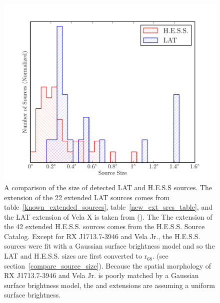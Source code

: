 \documentclass[12pt,preprint]{aastex}
\newcommand{\gev}{\text{GeV}\xspace}
\newcommand{\tev}{\text{TeV}\xspace}
\newcommand{\rsixeight}{{\ensuremath{\text{r}_{68}}}\xspace}
\begin{document}
\clearpage
\begin{figure}
  \begin{center}
    \includegraphics{summary_plots/gev_vs_tev_histogram.pdf}
    \end{center}
    \caption{
    A comparison of the size of detected LAT and H.E.S.S sources.
    The extension of the 22 extended LAT sources comes from
    table~\ref{known_extended_sources}, table~\ref{new_ext_srcs_table},
    and the LAT extension of Vela X is taken from (\cite{velax}). The
    The \tev extension of
    the 42 extended H.E.S.S. sources comes from the H.E.S.S. Source
    Catalog\cite{hesscat}.
    Except for RX J1713.7-3946 and Vela Jr.,
    the H.E.S.S. sources were fit with a Gaussian surface
    brightness model and
    so the LAT and H.E.S.S. sizes are first converted to \rsixeight.
    (see section~\ref{compare_source_size}). Because the spatial
    morphology of RX J1713.7-3946 and Vela Jr. is poorly matched by a
    Gaussian surface brightness model, the \gev and
    \tev extensions are assuming a uniform surface brightness.
    }\label{gev_vs_tev_histogram}
  \end{figure}
\end{document}
